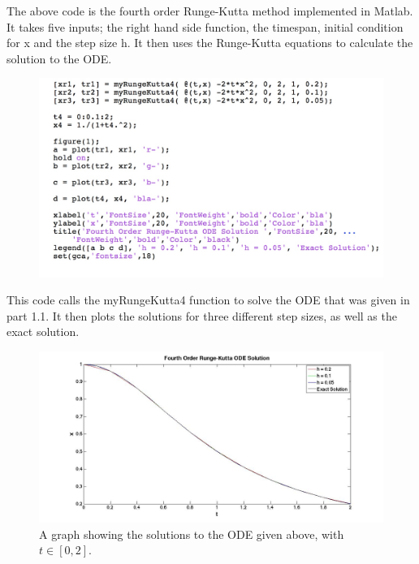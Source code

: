 \documentclass[a4paper]{article}
\begin{document}

The above code is the fourth order Runge-Kutta method implemented in Matlab. It takes five inputs; the right hand side function, the timespan, initial condition for x and the step size h. It then uses the Runge-Kutta equations to calculate the solution to the ODE. 


\begin{figure}[H]
\includegraphics[width=1\textwidth]{rungekuttacode.jpg}
\end{figure}


This code calls the myRungeKutta4 function to solve the ODE that was given in part 1.1. It then plots the solutions for three different step sizes, as well as the exact solution. 


\begin{figure}[H]
\centering
\includegraphics[width=1\textwidth]{rungekuttasolution.jpg}
\caption{\label{fig:rungekuttasolution}A graph showing the solutions to the ODE given above, with $t \in [0,2]$. }
\end{figure}
\end{document}
